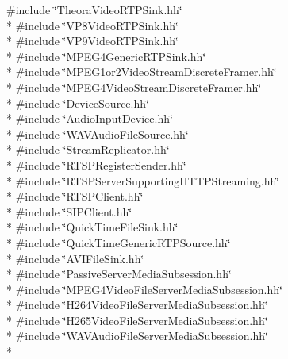 {\ttfamily \#include \char`\"{}Theora\+Video\+R\+T\+P\+Sink.\+hh\char`\"{}}\\*
{\ttfamily \#include \char`\"{}V\+P8\+Video\+R\+T\+P\+Sink.\+hh\char`\"{}}\\*
{\ttfamily \#include \char`\"{}V\+P9\+Video\+R\+T\+P\+Sink.\+hh\char`\"{}}\\*
{\ttfamily \#include \char`\"{}M\+P\+E\+G4\+Generic\+R\+T\+P\+Sink.\+hh\char`\"{}}\\*
{\ttfamily \#include \char`\"{}M\+P\+E\+G1or2\+Video\+Stream\+Discrete\+Framer.\+hh\char`\"{}}\\*
{\ttfamily \#include \char`\"{}M\+P\+E\+G4\+Video\+Stream\+Discrete\+Framer.\+hh\char`\"{}}\\*
{\ttfamily \#include \char`\"{}Device\+Source.\+hh\char`\"{}}\\*
{\ttfamily \#include \char`\"{}Audio\+Input\+Device.\+hh\char`\"{}}\\*
{\ttfamily \#include \char`\"{}W\+A\+V\+Audio\+File\+Source.\+hh\char`\"{}}\\*
{\ttfamily \#include \char`\"{}Stream\+Replicator.\+hh\char`\"{}}\\*
{\ttfamily \#include \char`\"{}R\+T\+S\+P\+Register\+Sender.\+hh\char`\"{}}\\*
{\ttfamily \#include \char`\"{}R\+T\+S\+P\+Server\+Supporting\+H\+T\+T\+P\+Streaming.\+hh\char`\"{}}\\*
{\ttfamily \#include \char`\"{}R\+T\+S\+P\+Client.\+hh\char`\"{}}\\*
{\ttfamily \#include \char`\"{}S\+I\+P\+Client.\+hh\char`\"{}}\\*
{\ttfamily \#include \char`\"{}Quick\+Time\+File\+Sink.\+hh\char`\"{}}\\*
{\ttfamily \#include \char`\"{}Quick\+Time\+Generic\+R\+T\+P\+Source.\+hh\char`\"{}}\\*
{\ttfamily \#include \char`\"{}A\+V\+I\+File\+Sink.\+hh\char`\"{}}\\*
{\ttfamily \#include \char`\"{}Passive\+Server\+Media\+Subsession.\+hh\char`\"{}}\\*
{\ttfamily \#include \char`\"{}M\+P\+E\+G4\+Video\+File\+Server\+Media\+Subsession.\+hh\char`\"{}}\\*
{\ttfamily \#include \char`\"{}H264\+Video\+File\+Server\+Media\+Subsession.\+hh\char`\"{}}\\*
{\ttfamily \#include \char`\"{}H265\+Video\+File\+Server\+Media\+Subsession.\+hh\char`\"{}}\\*
{\ttfamily \#include \char`\"{}W\+A\+V\+Audio\+File\+Server\+Media\+Subsession.\+hh\char`\"{}}\\*
